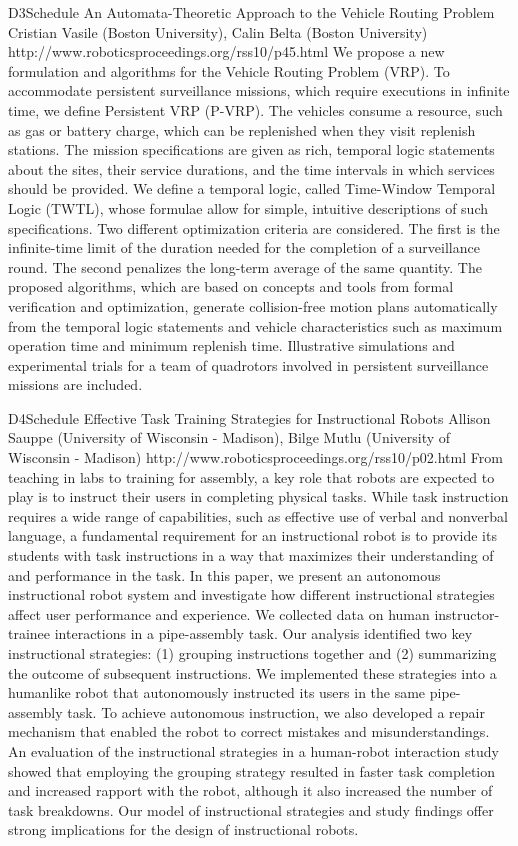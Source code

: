 \begin{spacing}{1.0}
\descriptionPaper
{D3}{Schedule}
{	
An Automata-Theoretic Approach to the Vehicle Routing Problem
}
{
Cristian Vasile (Boston University), Calin Belta (Boston University)
}
{
http://www.roboticsproceedings.org/rss10/p45.html
}
{
We propose a new formulation and algorithms for the Vehicle Routing Problem (VRP). To accommodate persistent surveillance missions, which require executions in infinite time, we define Persistent VRP (P-VRP). The vehicles consume a resource, such as gas or battery charge, which can be replenished when they visit replenish stations. The mission specifications are given as rich, temporal logic statements about the sites, their service durations, and the time intervals in which services should be provided. We define a temporal logic, called Time-Window Temporal Logic (TWTL), whose formulae allow for simple, intuitive descriptions of such specifications. Two different optimization criteria are considered. The first is the infinite-time limit of the duration needed for the completion of a surveillance round. The second penalizes the long-term average of the same quantity. The proposed algorithms, which are based on concepts and tools from formal verification and optimization, generate collision-free motion plans automatically from the temporal logic statements and vehicle characteristics such as maximum operation time and minimum replenish time. Illustrative simulations and experimental trials for a team of quadrotors involved in persistent surveillance missions are included.
}


\descriptionPaper
{D4}{Schedule}
{	
Effective Task Training Strategies for Instructional Robots 
}
{
Allison Sauppe (University of Wisconsin - Madison), Bilge Mutlu (University of Wisconsin - Madison)
}
{
http://www.roboticsproceedings.org/rss10/p02.html
}
{
From teaching in labs to training for assembly, a key role that robots are expected to play is to instruct their users in completing physical tasks. While task instruction requires a wide range of capabilities, such as effective use of verbal and nonverbal language, a fundamental requirement for an instructional robot is to provide its students with task instructions in a way that maximizes their understanding of and performance in the task. In this paper, we present an autonomous instructional robot system and investigate how different instructional strategies affect user performance and experience. We collected data on human instructor-trainee interactions in a pipe-assembly task. Our analysis identified two key instructional strategies: (1) grouping instructions together and (2) summarizing the outcome of subsequent instructions. We implemented these strategies into a humanlike robot that autonomously instructed its users in the same pipe-assembly task. To achieve autonomous instruction, we also developed a repair mechanism that enabled the robot to correct mistakes and misunderstandings. An evaluation of the instructional strategies in a human-robot interaction study showed that employing the grouping strategy resulted in faster task completion and increased rapport with the robot, although it also increased the number of task breakdowns. Our model of instructional strategies and study findings offer strong implications for the design of instructional robots.
}



\end{spacing}
